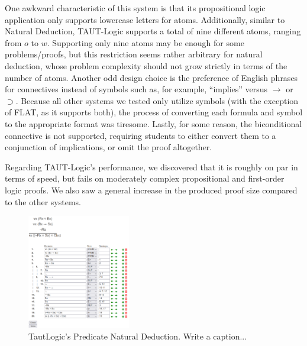 \documentclass[ms]{uncgdissertationexp2}
\theoremstyle{plain}
\theoremstyle{definition}
\theoremstyle{remark}
\newcommand{\titlecaption}[2]{\caption[#1]{#1. #2}}
\begin{document}
One awkward characteristic of this system is that its propositional logic application only supports lowercase letters for atoms. Additionally, similar to Natural Deduction, TAUT-Logic supports a total of nine different atoms, ranging from $o$ to $w$. Supporting only nine atoms may be enough for some problems/proofs, but this restriction seems rather arbitrary for natural deduction, whose problem complexity should not grow strictly in terms of the number of atoms. Another odd design choice is the preference of English phrases for connectives instead of symbols such as, for example, ``implies'' versus $\to$ or $\supset$. Because all other systems we tested only utilize symbols (with the exception of FLAT, as it supports both), the process of converting each formula and symbol to the appropriate format was tiresome. Lastly, for some reason, the biconditional connective is not supported, requiring students to either convert them to a conjunction of implications, or omit the proof altogether. 
    
Regarding TAUT-Logic's performance, we discovered that it is roughly on par in terms of speed, but fails on moderately complex propositional and first-order logic proofs. We also saw a general increase in the produced proof size compared to the other systems. 
\begin{figure}[h!]
	\centering
	\includegraphics[width=0.4\textwidth]{tautlogic.png}
	\titlecaption{TautLogic's Predicate Natural Deduction}{Write a caption...}
	\label{fig:tautlogic}
\end{figure} 
\end{document}
